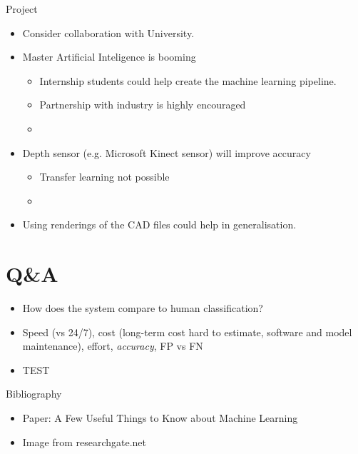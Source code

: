 \documentclass{beamer}
\begin{document}
\begin{frame}{Project} \begin{itemize}
 \item Consider collaboration with University.
 \item Master Artificial Inteligence is booming
  \begin{itemize}
  \item Internship students could help create the machine learning pipeline.
  \item Partnership with industry is highly encouraged
  \item  
  \end{itemize}
 \item Depth sensor (e.g. Microsoft Kinect sensor) will improve accuracy 
  \begin{itemize}
  \item Transfer learning not possible
  \item 
  \end{itemize}
 \item Using renderings of the CAD files could help in generalisation.
\end{itemize}
\end{frame}

\section{Q\&A}
\begin{frame}
  \begin{itemize}
	    \item How does the system compare to human classification?
	    \item Speed (vs 24/7), cost (long-term cost hard to estimate, software and model maintenance), effort, \emph{accuracy}, FP vs FN
	    \item TEST
  \end{itemize}
\end{frame}

\begin{frame}{Bibliography}
\begin{itemize}
 \item Paper: A Few Useful Things to Know about Machine Learning
 \item Image from researchgate.net
\end{itemize}

\end{frame}
\end{document}
